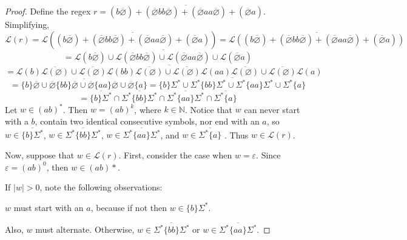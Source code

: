 \documentclass[11pt]{article}
\begin{document}
\begin{enumerate}[label=\textbf{Q\arabic*.}]
\begin{enumerate}[label=\textit{\alph*)}]
	\begin{proof}
		Define the regex \(r = \overline{(b\overline{\varnothing}) + (\overline{\varnothing}bb\overline{\varnothing}) + (\overline{\varnothing}aa\overline{\varnothing}) + (\overline{\varnothing}a)}\). Simplifying,
		\[
			\mathcal{L} (r) = \mathcal{L} \left(\overline{(b\overline{\varnothing}) + (\overline{\varnothing}bb\overline{\varnothing}) + (\overline{\varnothing}aa\overline{\varnothing}) + (\overline{\varnothing}a)}\right) = \overline{\mathcal{L}((b\overline{\varnothing}) + (\overline{\varnothing}bb\overline{\varnothing}) + (\overline{\varnothing}aa\overline{\varnothing}) + (\overline{\varnothing}a))}
		\]
		\[
			= \overline{\mathcal{L} (b\overline{\varnothing}) \cup \mathcal{L} (\overline{\varnothing}bb\overline{\varnothing}) \cup \mathcal{L} (\overline{\varnothing}aa\overline{\varnothing}) \cup \mathcal{L} (\overline{\varnothing}a)}
		\]
		\[
			= \overline{\mathcal{L} (b) \overline{\mathcal{L} (\varnothing)} \cup \overline{\mathcal{L} (\varnothing)} \mathcal{L} (bb) \overline{\mathcal{L} (\varnothing)} \cup \overline{\mathcal{L} (\varnothing)} \mathcal{L} (aa) \overline{\mathcal{L} (\varnothing)} \cup \overline{\mathcal{L} (\varnothing)}\mathcal{L} (a)}
		\]
		\[
			= \overline{\{b\} \overline{\varnothing} \cup \overline{\varnothing} \{bb\} \overline{\varnothing} \cup \overline{\varnothing} \{aa\} \overline{\varnothing} \cup \overline{\varnothing}\{a\}} = \overline{\{b\} \Sigma ^* \cup \Sigma ^* \{bb\} \Sigma ^* \cup \Sigma ^* \{aa\} \Sigma ^* \cup \Sigma ^* \{a\}}
		\]
		\[
			= \overline{\{b\}\Sigma ^*} \cap \overline{\Sigma ^* \{bb\}\Sigma ^*} \cap \overline{\Sigma ^* \{aa\} \Sigma ^*} \cap \overline{\Sigma ^* \{a\}}
		\]
		Let \(w \in (ab)^*\). Then \(w = (ab)^k\), where \(k \in \mathbb{N}\). Notice that \(w\) can never start with a \(b\), contain two identical consecutive symbols, nor end with an \(a\), so \(w \in \overline{\{b\}\Sigma ^*}\), \(w \in \overline{\Sigma ^* \{bb\}\Sigma ^*}\), \(w \in \overline{\Sigma ^* \{aa\} \Sigma ^*}\), and \(w \in \overline{\Sigma ^* \{a\}}\) . Thus \(w \in \mathcal{L} (r)\).

		Now, suppose that \(w \in \mathcal{L} (r)\). First, consider the case when \(w = \varepsilon\). Since \(\varepsilon = (ab)^0\), then \(w \in (ab)*\).
		
		If \(|w| > 0\), note the following observations:

		\(w\) must start with an \(a\), because if not then \(w \in \{b\}\Sigma ^*\).

		Also, \(w\) must alternate. Otherwise, \(w \in \overline{\Sigma ^* \{bb\}\Sigma ^*}\) or \(w \in \overline{\Sigma ^* \{aa\} \Sigma ^*}\).


\end{proof}
\end{enumerate}
\end{enumerate}
\end{document}
